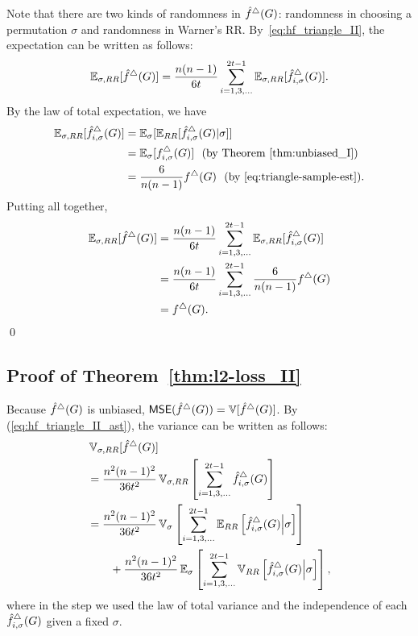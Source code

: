 Note that there are two kinds of randomness in $\hat{f}^\triangle(G)$: randomness in
choosing a permutation $\sigma$ and randomness in Warner's RR.
By~\eqref{eq:hf_triangle_II}, the expectation can be written as follows:
\begin{align*}
    \operatorname{\mathbb{E}}_{\sigma, RR}[\hat{f}^\triangle(G)]
    = \frac{n(n-1)}{6t} \sum_{i=1, 3, \ldots}^{2t-1} \operatorname{\mathbb{E}}_{\sigma,
    RR}[\hat{f}_{i,\sigma}^\triangle(G)].
\end{align*}
By the law of total expectation, we have
\begin{align*}
    \operatorname{\mathbb{E}}_{\sigma, RR}[\hat{f}_{i,\sigma}^\triangle(G)]
    &= \operatorname{\mathbb{E}}_\sigma [\operatorname{\mathbb{E}}_{RR}[\hat{f}_{i,\sigma}^\triangle(G) | \sigma]] \\
    &= \operatorname{\mathbb{E}}_\sigma [f_{i,\sigma}^\triangle(G)] ~~ \text{(by
    Theorem~\ref{thm:unbiased_I})} \\
    &= \frac{6}{n(n-1)}f^\triangle(G)~~ \text{(by~\eqref{eq:triangle-sample-est})}.
\end{align*}
Putting all together,
\begin{align*}
  \operatorname{\mathbb{E}}_{\sigma, RR}[\hat{f}^\triangle(G)] &=
  \frac{n(n-1)}{6t}\sum_{i=1,3,\ldots}^{2t-1} \operatorname{\mathbb{E}}_{\sigma,
  RR}[\hat{f}_{i,\sigma}^\triangle(G)] \\
  &= \frac{n(n-1)}{6t} \sum_{i=1,3,\ldots}^{2t-1} \frac{6}{n(n-1)}f^\triangle(G)
  \\
  &= f^\triangle(G).
\end{align*}\qed

\subsection{Proof of Theorem~\ref{thm:l2-loss_II}}
\label{sub:l2-loss_II_proof}
Because $\hat{f}^\triangle(G)$ is unbiased, $\operatorname{\textsf{MSE}}(\hat{f}^\triangle(G)) = \operatorname{\mathbb{V}}[\hat{f}^\triangle(G)]$.
By (\ref{eq:hf_triangle_II_ast}), the variance can be written as follows:
\begin{align}
    & \operatorname{\mathbb{V}}_{\sigma,RR}[\hat{f}^\triangle(G)] \nonumber\\
    &= \frac{n^2(n-1)^2}{36t^2}
    \operatorname{\mathbb{V}}_{\sigma, RR}\left[\sum_{i=1, 3, \ldots}^{2t-1} \hat{f}_{i,\sigma}^\triangle(G)\right] \nonumber\\
    &= \frac{n^2(n-1)^2}{36t^2}
    \operatorname{\mathbb{V}}_\sigma\left[\sum_{i = 1, 3, \ldots}^{2t-1}
    \operatorname{\mathbb{E}}_{RR}\left[\hat{f}_{i,\sigma}^\triangle(G)\middle|\sigma \right]\right]
    \label{eq:thm:l2-loss_II_ve} \\
    &\qquad + \frac{n^2(n-1)^2}{36t^2}
    \operatorname{\mathbb{E}}_\sigma\left[\sum_{i = 1, 3, \ldots}^{2t-1} \operatorname{\mathbb{V}}_{RR}\left[\hat{f}_{i,\sigma}^\triangle(G)\middle|\sigma \right]\right],
    \label{eq:thm:l2-loss_II_ev}
\end{align}
where in the
step we used the law of total variance and the independence of each
$\hat{f}_{i,\sigma}^\triangle(G)$ given a fixed $\sigma$.

